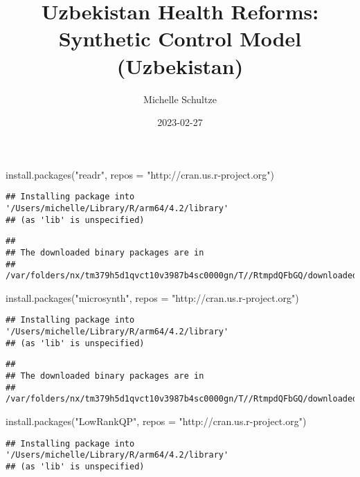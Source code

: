 \documentclass[
]{article}
\title{Uzbekistan Health Reforms: Synthetic Control Model (Uzbekistan)}
\author{Michelle Schultze}
\date{2023-02-27}
\newenvironment{Shaded}{\begin{snugshade}}{\end{snugshade}}
\newcommand{\AttributeTok}[1]{\textcolor[rgb]{0.77,0.63,0.00}{#1}}
\newcommand{\FunctionTok}[1]{\textcolor[rgb]{0.00,0.00,0.00}{#1}}
\newcommand{\NormalTok}[1]{#1}
\newcommand{\StringTok}[1]{\textcolor[rgb]{0.31,0.60,0.02}{#1}}
\begin{document}
\maketitle

\begin{Shaded}
\begin{Highlighting}[]
\FunctionTok{install.packages}\NormalTok{(}\StringTok{"readr"}\NormalTok{, }\AttributeTok{repos =} \StringTok{"http://cran.us.r{-}project.org"}\NormalTok{)}
\end{Highlighting}
\end{Shaded}

\begin{verbatim}
## Installing package into '/Users/michelle/Library/R/arm64/4.2/library'
## (as 'lib' is unspecified)
\end{verbatim}

\begin{verbatim}
## 
## The downloaded binary packages are in
##  /var/folders/nx/tm379h5d1qvct10v3987b4sc0000gn/T//RtmpdQFbGQ/downloaded_packages
\end{verbatim}

\begin{Shaded}
\begin{Highlighting}[]
\FunctionTok{install.packages}\NormalTok{(}\StringTok{"microsynth"}\NormalTok{, }\AttributeTok{repos =} \StringTok{"http://cran.us.r{-}project.org"}\NormalTok{)}
\end{Highlighting}
\end{Shaded}

\begin{verbatim}
## Installing package into '/Users/michelle/Library/R/arm64/4.2/library'
## (as 'lib' is unspecified)
\end{verbatim}

\begin{verbatim}
## 
## The downloaded binary packages are in
##  /var/folders/nx/tm379h5d1qvct10v3987b4sc0000gn/T//RtmpdQFbGQ/downloaded_packages
\end{verbatim}

\begin{Shaded}
\begin{Highlighting}[]
\FunctionTok{install.packages}\NormalTok{(}\StringTok{"LowRankQP"}\NormalTok{, }\AttributeTok{repos =} \StringTok{"http://cran.us.r{-}project.org"}\NormalTok{)}
\end{Highlighting}
\end{Shaded}

\begin{verbatim}
## Installing package into '/Users/michelle/Library/R/arm64/4.2/library'
## (as 'lib' is unspecified)
\end{verbatim}
\end{document}
